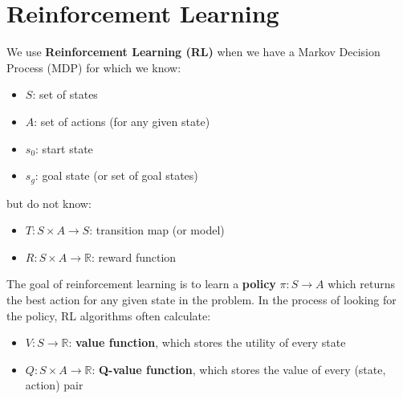 \documentclass[a4paper]{article}
\begin{document}
\section*{Reinforcement Learning}
\noindent We use \textbf{Reinforcement Learning (RL)} when we have a Markov Decision Process (MDP) for which we know: 
\begin{itemize}
    \item $S$: set of states
    \item $A$: set of actions (for any given state)
    \item $s_0$: start state
    \item $s_g$: goal state (or set of goal states)
\end{itemize}
but do not know:
\begin{itemize}
    \item $T : S \times A \to S$: transition map (or model)
    \item $R : S \times A \to \mathbb{R}$: reward function
\end{itemize}
\newpage
The goal of reinforcement learning is to learn a \textbf{policy} $\pi: S \to A$ which returns the best action for any given state in the problem. In the process of looking for the policy, RL algorithms often calculate:
\begin{itemize}
    \item $V : S \to \mathbb{R}$: \textbf{value function}, which stores the utility of every state
    \item $Q : S \times A \to \mathbb{R}$: \textbf{Q-value function}, which stores the value of every (state, action) pair \\
\end{itemize}
\end{document}
